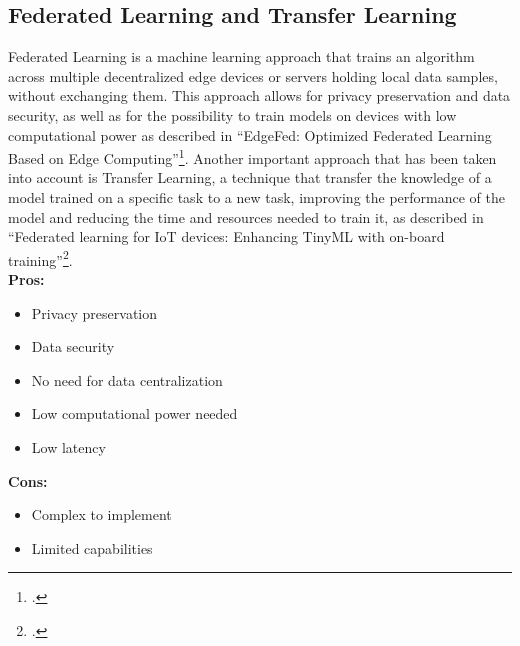 \subsection{Federated Learning and Transfer Learning}
Federated Learning is a machine learning approach that trains an algorithm across multiple decentralized edge devices or servers holding local data samples, without exchanging them. This approach allows for privacy preservation and data security, as well as for the possibility to train models on devices with low computational power as described in \enquote{EdgeFed: Optimized Federated Learning
Based on Edge Computing}\footcite[]{9260194}.
Another important approach that has been taken into account is Transfer Learning, a technique that transfer the knowledge of a model trained on a specific task to a new task, improving the performance of the model and reducing the time and resources needed to train it, as described in \enquote{Federated learning for IoT devices: Enhancing TinyML with on-board training}\footcite{FICCO2024102189}.\\
\textbf{Pros:}
\begin{itemize}
    \item Privacy preservation
    \item Data security
    \item No need for data centralization
    \item Low computational power needed
    \item Low latency
\end{itemize}
\textbf{Cons:}
\begin{itemize}
    \item Complex to implement
    \item Limited capabilities
\end{itemize}